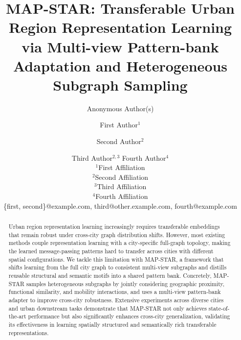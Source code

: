 \documentclass{article}
\title{MAP-STAR: Transferable Urban Region Representation Learning via Multi-view Pattern-bank Adaptation and Heterogeneous Subgraph Sampling}
\author{
    Anonymous Author(s)
}
\author{
First Author$^1$
\and
Second Author$^2$\and
Third Author$^{2,3}$\And
Fourth Author$^4$\\
\affiliations
$^1$First Affiliation\\
$^2$Second Affiliation\\
$^3$Third Affiliation\\
$^4$Fourth Affiliation\\
\emails
\{first, second\}@example.com,
third@other.example.com,
fourth@example.com
}
\begin{document}
\maketitle

\begin{abstract}

    Urban region representation learning increasingly requires transferable embeddings that remain robust under cross-city graph distribution shifts. However, most existing methods couple representation learning with a city-specific full-graph topology, making the learned message-passing patterns hard to transfer across cities with different spatial configurations. We tackle this limitation with MAP-STAR, a framework that shifts learning from the full city graph to consistent multi-view subgraphs and distills reusable structural and semantic motifs into a shared pattern bank. Concretely, MAP-STAR samples heterogeneous subgraphs by jointly considering geographic proximity, functional similarity, and mobility interactions, and uses a multi-view pattern-bank adapter to improve cross-city robustness. Extensive experiments across diverse cities and urban downstream tasks demonstrate that MAP-STAR not only achieves state-of-the-art performance but also significantly enhances cross-city generalization, validating its effectiveness in learning spatially structured and semantically rich transferable representations.


\end{abstract}
\end{document}
